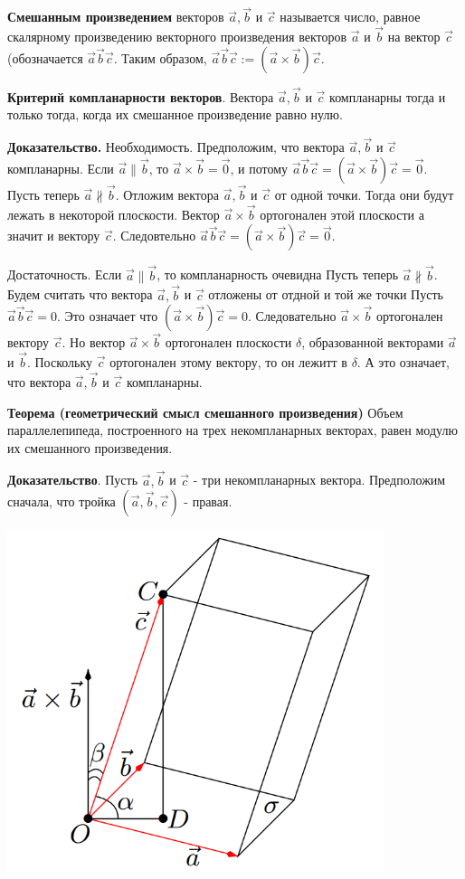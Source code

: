 \documentclass[a4paper]{article}
\begin{document}
{\begin{small}
\textbf{Смешанным произведением} векторов $\vec{a}, \vec{b}$ и $\vec{c}$ называется число, равное
скалярному произведению векторного произведения векторов $\vec{a}$ и $\vec{b}$
на вектор $\vec{c}$ (обозначается $\vec{a} \vec{b} \vec{c}$.
Таким образом, $\vec{a} \vec{b} \vec{c} := (\vec{a} \times \vec{b}) \vec{c}$.

\textbf{Критерий компланарности векторов}. Вектора $\vec{a}, \vec{b}$ и $\vec{c}$ компланарны тогда и только тогда, когда их смешанное
произведение равно нулю.

\textbf{Доказательство.} Необходимость. Предположим, что вектора $\vec{a}, \vec{b}$ и $\vec{c}$ компланарны. Если $\vec{a} \parallel \vec{b}$, то $\vec{a} \times \vec{b} = \vec{0}$, и потому $\vec{a} \vec{b} \vec{c} = (\vec{a} \times \vec{b} ) \vec{c} = \vec{0}$. \\
Пусть теперь $\vec{a} \nparallel \vec{b}$. Отложим вектора $\vec{a}, \vec{b}$ и $\vec{c}$ от одной точки. Тогда они будут лежать в некоторой плоскости. Вектор $\vec{a} \times \vec{b}$ ортогонален этой плоскости а значит и вектору $\vec{c}$. Следовтельно $\vec{a} \vec{b} \vec{c} = (\vec{a} \times \vec{b} ) \vec{c} = \vec{0}$.

Достаточность. Если $\vec{a} \parallel \vec{b}$, то компланарность очевидна Пусть теперь $\vec{a} \nparallel \vec{b}$. Будем считать что вектора $\vec{a}, \vec{b}$ и $\vec{c}$ отложены от отдной и той же точки Пусть $\vec{a} \vec{b} \vec{c} = 0$. Это означает что $(\vec{a} \times \vec{b}) \vec{c} = 0$. Следовательно $\vec{a} \times \vec{b}$ ортогонален вектору $\vec{c}$. Но вектор $\vec{a} \times \vec{b}$ ортогонален плоскости $\delta$, образованной векторами $\vec{a}$ и $\vec{b}$. Поскольку $\vec{c}$ ортогонален этому вектору, то он лежитт в $\delta$. А это означает, что вектора $\vec{a}, \vec{b}$ и $\vec{c}$ компланарны.

\textbf{Теорема  (геометрический смысл смешанного произведения)} Объем параллелепипеда, построенного на трех некомпланарных векторах,
равен модулю их смешанного произведения.

\textbf{Доказательство}. Пусть $\vec{a}, \vec{b}$ и $\vec{c}$ - три некомпланарных вектора. Предположим сначала, что тройка $(\vec{a}, \vec{b}, \vec{c})$ - правая. 

\includegraphics[width=11cm]{t4}



\end{small}}
\end{document}

